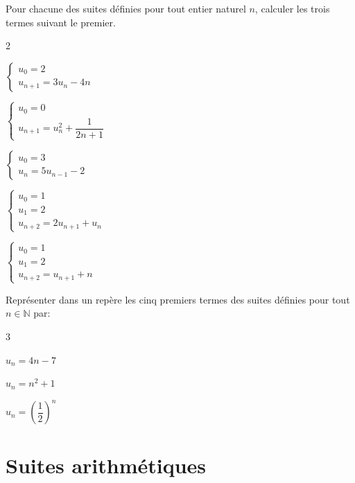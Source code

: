 \documentclass[11pt,a4paper]{article}  %
\begin{document}
Pour chacune des suites définies pour tout entier naturel $n$, calculer les trois termes suivant le premier.
\begin{multicols}{2}
	\begin{enumMet}
		\item $\left\{\begin{array}{l}u_0=2 \\ u_{n+1}=3 u_n-4 n\end{array}\right.$
		\item $\left\{\begin{array}{l}u_0=0 \\ u_{n+1}=u_n^2+\dfrac{1}{2 n+1}\end{array}\right.$
		\item $\left\{\begin{array}{l}u_0=3 \\ u_n=5 u_{n-1}-2\end{array}\right.$
		\item $\left\{\begin{array}{l}u_0=1 \\ u_1=2 \\ u_{n+2}=2 u_{n+1}+u_n\end{array}\right.$
		\item $\left\{\begin{array}{l}u_0=1 \\ u_1=2 \\ u_{n+2}=u_{n+1}+n\end{array}\right.$
	\end{enumMet}
\end{multicols}


Représenter dans un repère les cinq premiers termes des suites définies pour tout $n \in \mathbb{N}$ par:
\begin{multicols}{3}
	\begin{enumMet}
	\item $u_n=4 n-7$
	\item $u_n=n^2+1$
	\item $u_n=\left(\dfrac{1}{2}\right)^n$
\end{enumMet}
\end{multicols}

\section{Suites arithmétiques}

\end{document}
